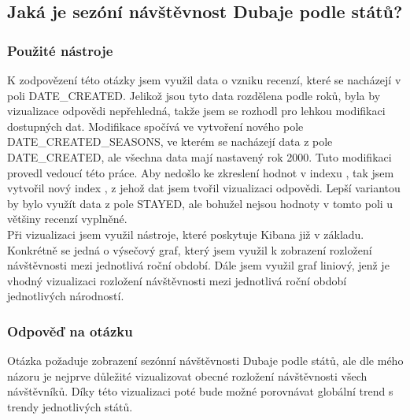 \documentclass[czech,BP]{thesiskiv}
\begin{document}
\subsection{Jaká je sezóní návštěvnost Dubaje podle států?}
\subsubsection{Použité nástroje}
K zodpovězení této otázky jsem využil data o vzniku recenzí, které se nacházejí v poli DATE\_CREATED. Jelikož jsou tyto data rozdělena podle roků, byla by vizualizace odpovědi nepřehledná, takže jsem se rozhodl pro lehkou modifikaci dostupných dat. Modifikace spočívá ve vytvoření nového pole DATE\_CREATED\_SEASONS, ve kterém se nacházejí data z pole DATE\_CREATED, ale všechna data mají nastavený rok 2000. Tuto modifikaci provedl vedoucí této práce. Aby nedošlo ke zkreslení hodnot v indexu , tak jsem vytvořil nový index , z jehož dat jsem tvořil vizualizaci odpovědi. Lepší variantou by bylo využít data z pole STAYED, ale bohužel nejsou hodnoty v tomto poli u většiny recenzí vyplněné.
\\
Při vizualizaci jsem využil nástroje, které poskytuje Kibana již v základu. Konkrétně se jedná o výsečový graf, který jsem využil k zobrazení rozložení návštěvnosti mezi jednotlivá roční období. Dále jsem využil graf liniový, jenž je vhodný vizualizaci rozložení návštěvnosti mezi jednotlivá roční období jednotlivých národností.

\subsubsection{Odpověď na otázku}
Otázka požaduje zobrazení sezónní návštěvnosti Dubaje podle států, ale dle mého názoru je nejprve důležité vizualizovat obecné rozložení návštěvnosti všech návštěvníků. Díky této vizualizaci poté bude možné porovnávat globální trend s trendy jednotlivých států.
\end{document}
